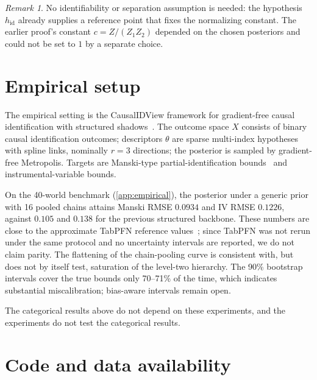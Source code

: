 \documentclass[11pt]{article}
\theoremstyle{definition}
\theoremstyle{remark}
\newtheorem{remark}[theorem]{Remark}
\newcommand{\hid}{h_{\mathrm{id}}}
\begin{document}
\begin{remark}
No identifiability or separation assumption is needed: the hypothesis $\hid$ already supplies a
reference point that fixes the normalizing constant. The earlier proof's constant
$c=Z/(Z_1Z_2)$ depended on the chosen posteriors and could not be set to $1$ by a separate choice.
\end{remark}

\section{Empirical setup}

The empirical setting is the CausalIDView framework for gradient-free causal identification with
structured shadows~\cite{Awasthi-CausalIDView}. The outcome space $X$ consists of binary causal
identification outcomes; descriptors $\theta$ are sparse multi-index hypotheses with spline links,
nominally $r=3$ directions; the posterior is sampled by gradient-free Metropolis. Targets are
Manski-type partial-identification bounds~\cite{Manski1990} and instrumental-variable bounds.

On the 40-world benchmark (\cref{app:empirical}), the posterior under a generic prior with 16 pooled
chains attains Manski RMSE $0.0934$ and IV RMSE $0.1226$, against $0.105$ and $0.138$ for the
previous structured backbone. These numbers are close to the approximate TabPFN reference
values~\cite{Hollmann2023}; since TabPFN was not rerun under the same protocol and no uncertainty
intervals are reported, we do not claim parity. The flattening of the chain-pooling curve is
consistent with, but does not by itself test, saturation of the level-two hierarchy. The 90\%
bootstrap intervals cover the true bounds only 70--71\% of the time, which indicates substantial
miscalibration; bias-aware intervals remain open.

The categorical results above do not depend on these experiments, and the experiments do not test
the categorical results.

\section{Code and data availability}
\end{document}
